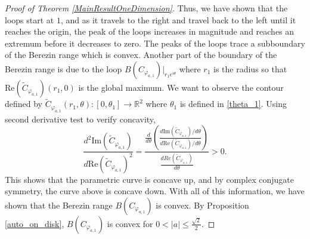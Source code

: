 \documentclass{amsart}
\theoremstyle{remark}
\begin{document}
\begin{proof}[Proof of Theorem \ref{MainResultOneDimension}]
Thus, we have shown that the loops start at $1$, and as it travels to the right and travel back to the left until it reaches the origin, the peak of the loops increases in magnitude and reaches an extremum before it decreases to zero. The peaks of the loops trace a subboundary of the Berezin range which is convex. Another part of the boundary of the Berezin range is due to the loop $B(C_{\varphi_{a,1}})|_{r_1e^{i\theta}}$ where $r_1$ is the radius so that $\mathrm{Re}(\widetilde{C}_{\varphi_{a,1}})(r_1,0)$ is the global maximum. We want to observe the contour defined by $\widetilde{C}_{\varphi_{a,1}}(r_1,\theta): [0,\theta_1] \rightarrow \mathbb{R}^2 $ where $\theta_1$ is defined in \eqref{theta_1}.  Using second derivative test to verify concavity, 
\[\dfrac{d^2\mathrm{Im}(\widetilde{C}_{\varphi_{a,1}})}{d\mathrm{Re}(\widetilde{C}_{\varphi_{a,1}})^2}=\dfrac{\frac{d}{d\theta}\left(\frac{d\mathrm{Im}(\widetilde{C}_{\varphi_{a,1}})/d\theta}{d\mathrm{Re}(\widetilde{C}_{\varphi_{a,1}})/d\theta}\right)}{\frac{dRe(\widetilde{C}_{\varphi_{a,1}})}{d\theta}} > 0.\]
This shows that the parametric curve is concave up, and by complex conjugate symmetry, the curve above is concave down. With all of this information, we have shown that the Berezin range $B(C_{\varphi_{a,1}})$ is convex. By Proposition \ref{auto_on_disk}, $B(C_{\varphi_{a,1}})$ is convex for $0< |a| \leq \frac{\sqrt{2}}{2}$.  
\end{proof}
\end{document}
